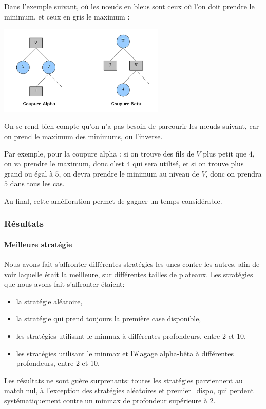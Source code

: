 Dans l'exemple suivant, où les nœuds en bleus sont ceux où l'on doit prendre
le minimum, et ceux en gris le maximum :
\begin{center}
  \includegraphics[width=300px]{../../jeux/coupures_alpha-beta.png}
\end{center}
On se rend bien compte qu'on n'a pas besoin de parcourir les nœuds suivant,
car on prend le maximum des minimums, ou l'inverse.

Par exemple, pour la coupure alpha : si on trouve des fils de $V$ plus petit
que $4$, on va prendre le maximum, donc c'est $4$ qui sera utilisé, et si on
trouve plus grand ou égal à $5$, on devra prendre le minimum au niveau de $V$,
donc on prendra $5$ dans tous les cas.

Au final, cette amélioration permet de gagner un temps considérable.
\subsubsection{Résultats}
\paragraph{Meilleure stratégie}
Nous avons fait s'affronter différentes stratégies les unes contre les
autres, afin de voir laquelle était la meilleure, sur différentes
tailles de plateaux. Les stratégies que nous avons fait s'affronter
étaient:
\begin{itemize}
  \item la stratégie aléatoire,
  \item la stratégie qui prend toujours la première case disponible,
  \item les stratégies utilisant le minmax à différentes profondeurs,
    entre 2 et 10,
  \item les stratégies utilisant le minmax et l'élagage alpha-bêta à
    différentes profondeurs, entre 2 et 10.
\end{itemize}
Les résultats ne sont guère surprenants: toutes les stratégies
parviennent au match nul, à l'exception des stratégies aléatoires et
premier\_dispo, qui perdent systématiquement contre un minmax de
profondeur supérieure à 2.

